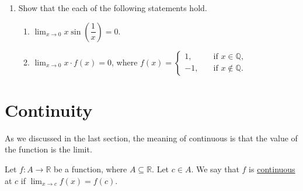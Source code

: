 \documentclass[11pt]{book}
\theoremstyle{break}
\theoremstyle{no_label}
\newcommand{\bbR}{\mathbb{R}}
\numberwithin{equation}{section}
\begin{document}
\begin{enumerate}[label=\arabic*.]
\begin{enumerate}
    \end{enumerate}
    \item Show that the each of the following statements hold.
        \begin{enumerate}
            \item $\displaystyle\lim_{x\to 0}x\sin\left(\dfrac{1}{x}\right)=0$.
            \setlength{\delimitershortfall}{13.5pt}
            \item $\displaystyle\lim_{x\to 0}x\cdot f(x)=0$, where $f(x)=\left\{\begin{array}{rl}
                1,\quad & \text{if $x\in\mathbb{Q}$},\\
                -1,\quad & \text{if $x\notin\mathbb{Q}$}.
            \end{array}\right.$
            \setlength{\delimitershortfall}{0pt}
        \end{enumerate}
    \setlength{\delimitershortfall}{13.5pt}
\end{enumerate}

\section{Continuity}

As we discussed in the last section, the meaning of continuous is that the value of the function is the limit.

\begin{definition}[Continuous]
    Let $f:A\to\bbR$ be a function, where $A\subseteq\bbR$. Let $c\in A$. We say that $f$ is \underline{continuous} at $c$ if $\displaystyle\lim_{x\to c}f(x)=f(c)$.
\end{definition}
\end{document}
